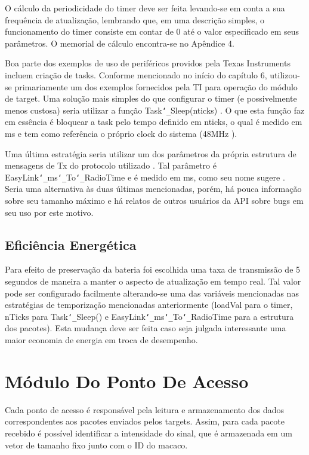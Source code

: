 O cálculo da periodicidade do timer deve ser feita levando-se em conta a sua frequência de atualização, lembrando que, em uma descrição simples, o funcionamento do timer consiste em contar de 0 até o valor especificado em seus parâmetros. O memorial de cálculo encontra-se no Apêndice 4.

Boa parte dos exemplos de uso de periféricos providos pela Texas Instruments incluem criação de tasks. Conforme mencionado no início do capítulo 6, utilizou-se primariamente um dos exemplos fornecidos pela TI para operação do módulo de target. Uma solução mais simples do que configurar o timer (e possivelmente menos custosa) seria utilizar a função Task\texttt{\char`_}Sleep(nticks) \cite{task-modules}. O que esta função faz em essência é bloquear a task pelo tempo definido em nticks, o qual é medido em ms e tem como referência o próprio clock do sistema (48MHz \cite{datasheet}).

Uma última estratégia seria utilizar um dos parâmetros da própria estrutura de mensagens de Tx do protocolo utilizado \cite{forum-easylink}. Tal parâmetro é EasyLink\texttt{\char`_}ms\texttt{\char`_}To\texttt{\char`_}RadioTime e é medido em ms, como seu nome sugere \cite{easylink}. Seria uma alternativa às duas últimas mencionadas, porém, há pouca informação sobre seu tamanho máximo e há relatos de outros usuários da API sobre bugs em seu uso por este motivo.

\subsection{Eficiência Energética}

Para efeito de preservação da bateria foi escolhida uma taxa de transmissão de 5 segundos de maneira a manter o aspecto de atualização em tempo real. Tal valor pode ser configurado facilmente alterando-se uma das variáveis mencionadas nas estratégias de temporização mencionadas anteriormente (loadVal para o timer, nTicks para Task\texttt{\char`_}Sleep() e EasyLink\texttt{\char`_}ms\texttt{\char`_}To\texttt{\char`_}RadioTime para a estrutura dos pacotes). Esta mudança deve ser feita caso seja julgada interessante uma maior economia de energia em troca de desempenho.

\section{Módulo Do Ponto De Acesso}

Cada ponto de acesso é responsável pela leitura e armazenamento dos dados correspondentes aos pacotes enviados pelos targets. Assim, para cada pacote recebido é possível identificar a intensidade do sinal, que é armazenada em um vetor de tamanho fixo junto com o ID do macaco.

